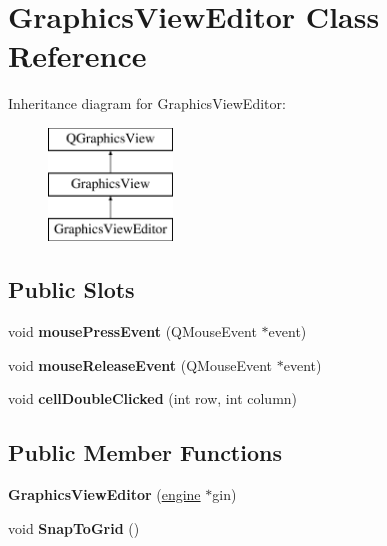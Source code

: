 \hypertarget{class_graphics_view_editor}{\section{Graphics\-View\-Editor Class Reference}
\label{class_graphics_view_editor}
}
Inheritance diagram for Graphics\-View\-Editor\-:\begin{figure}[H]
\begin{center}
\leavevmode
\includegraphics[height=3.000000cm]{class_graphics_view_editor}
\end{center}
\end{figure}
\subsection*{Public Slots}
\begin{DoxyCompactItemize}
\item 
\hypertarget{class_graphics_view_editor_a6709bc9e3a7f23511cfa0c4db6d92b5a}{void {\bfseries mouse\-Press\-Event} (Q\-Mouse\-Event $\ast$event)}\label{class_graphics_view_editor_a6709bc9e3a7f23511cfa0c4db6d92b5a}

\item 
\hypertarget{class_graphics_view_editor_aeba5b3d56d1e31abe9131476ddd7d20e}{void {\bfseries mouse\-Release\-Event} (Q\-Mouse\-Event $\ast$event)}\label{class_graphics_view_editor_aeba5b3d56d1e31abe9131476ddd7d20e}

\item 
\hypertarget{class_graphics_view_editor_a662d6bdadf85a5726a895218d08fdb78}{void {\bfseries cell\-Double\-Clicked} (int row, int column)}\label{class_graphics_view_editor_a662d6bdadf85a5726a895218d08fdb78}

\end{DoxyCompactItemize}
\subsection*{Public Member Functions}
\begin{DoxyCompactItemize}
\item 
\hypertarget{class_graphics_view_editor_a23421b24ada3080db4b460bf00ac9965}{{\bfseries Graphics\-View\-Editor} (\hyperlink{classengine}{engine} $\ast$gin)}\label{class_graphics_view_editor_a23421b24ada3080db4b460bf00ac9965}

\item 
\hypertarget{class_graphics_view_editor_a5a50c83ccce7cf211e36507beab4d68a}{void {\bfseries Snap\-To\-Grid} ()}\label{class_graphics_view_editor_a5a50c83ccce7cf211e36507beab4d68a}

\end{DoxyCompactItemize}
